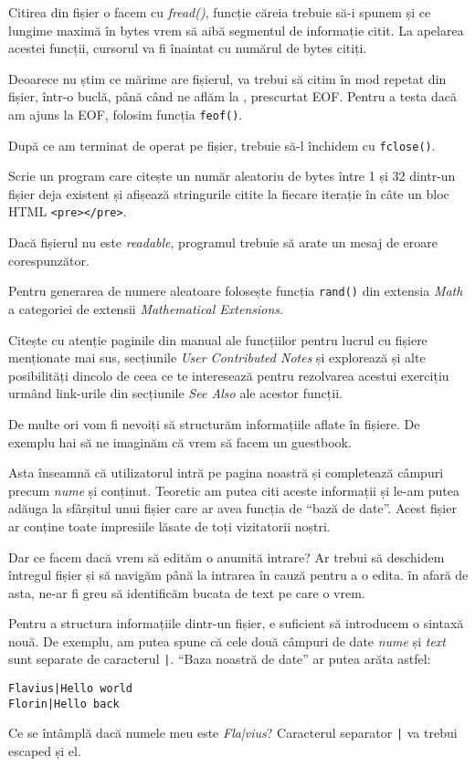 Citirea din fișier o facem cu \textsl{fread()}, funcție căreia trebuie
să-i spunem și ce lungime maximă în bytes vrem să aibă segmentul
de informație citit.
La apelarea acestei funcții, cursorul va fi înaintat cu numărul
de bytes citiți.

Deoarece nu știm ce mărime are fișierul, va trebui să citim
în mod repetat din fișier, într-o buclă, până când ne aflăm
la , prescurtat EOF.
Pentru a testa dacă am ajuns la EOF, folosim funcția \texttt{feof()}.

După ce am terminat de operat pe fișier, trebuie să-l închidem cu
\texttt{fclose()}.

\begin{Exercise}[title={Citește din fișier}]
Scrie un program care 
citește un număr aleatoriu de bytes între 1 și 32 dintr-un fișier deja existent
și afișează stringurile citite la fiecare iterație în câte
un bloc HTML \texttt{<pre></pre>}.

Dacă fișierul nu este \textit{readable}, programul trebuie
să arate un mesaj de eroare corespunzător.

Pentru generarea de numere aleatoare folosește funcția
\texttt{rand()} din extensia \textit{Math} a categoriei
de extensii \textit{Mathematical Extensions}.

Citește cu atenție paginile din manual ale funcțiilor pentru
lucrul cu fișiere menționate mai sus, secțiunile \textit{User
Contributed Notes} și explorează și alte posibilități
dincolo de ceea ce te interesează pentru rezolvarea acestui
exercițiu urmând link-urile din secțiunile \textit{See Also}
ale acestor funcții.
\end{Exercise}

De multe ori vom fi nevoiți să structurăm informațiile aflate \^in
fișiere. De exemplu hai să ne imaginăm că vrem să facem un guestbook.

Asta \^inseamnă că utilizatorul intră pe pagina noastră și completează
c\^ampuri precum \textit{nume} și conținut. Teoretic am putea citi
aceste informații și le-am putea adăuga la sf\^arșitul unui fișier
care ar avea funcția de ``bază de date''. Acest
fișier ar conține toate impresiile lăsate de toți vizitatorii noștri.

Dar ce facem dacă vrem să edităm o anumită intrare? Ar trebui să
deschidem \^intregul fișier și să navigăm p\^ană la intrarea \^in cauză
pentru a o edita. \^in afară de asta, ne-ar fi greu să identificăm
bucata de text pe care o vrem.

Pentru a structura informațiile dintr-un fișier, e suficient să
introducem o sintaxă nouă. De exemplu, am putea spune că
cele două c\^ampuri de date \textit{nume} și \textit{text} sunt separate
de caracterul \texttt{|}. ``Baza noastră de date'' ar
putea arăta astfel:
\begin{verbatim}
Flavius|Hello world
Florin|Hello back
\end{verbatim}
Ce se \^int\^amplă dacă numele meu este \textsl{Fla|vius}? Caracterul separator
\texttt{|} va trebui escaped și el.


